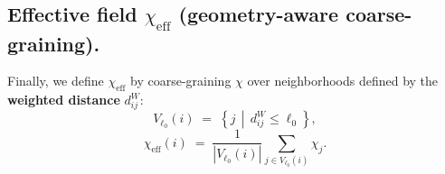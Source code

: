 \subsection{Effective field \texorpdfstring{$\chi_{\mathrm{eff}}$}{χeff} (geometry-aware coarse-graining).}
  \label{subsec:chi_eff}
  Finally, we define $\chi_{\mathrm{eff}}$ by coarse-graining $\chi$ over neighborhoods defined
  by the \textbf{weighted distance} $d_{ij}^{W}$:
  \begin{equation}
    V_{\ell_0}(i)
    \;=\;
    \left\{ j \,\middle|\, d_{ij}^{W} \le \ell_0 \right\},
    \label{eq:weighted_neighborhood}
  \end{equation}
  \begin{equation}
    \chi_{\mathrm{eff}}(i)
    \;=\;
    \frac{1}{|V_{\ell_0}(i)|}
    \sum_{j\in V_{\ell_0}(i)} \chi_j.
    \label{eq:chi_eff_definition}
  \end{equation}
